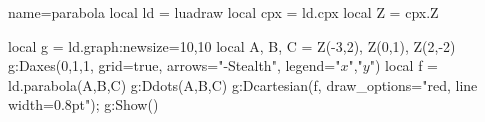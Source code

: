 \documentclass{standalone}%
\begin{document}
\begin{luadraw}{name=parabola}
local ld = luadraw
local cpx = ld.cpx
local Z = cpx.Z

local g = ld.graph:new{size={10,10}}
local A, B, C = Z(-3,2), Z(0,1), Z(2,-2)
g:Daxes({0,1,1}, {grid=true, arrows="-Stealth", legend={"$x$","$y$"}})
local f = ld.parabola(A,B,C)
g:Ddots({A,B,C})
g:Dcartesian(f, {draw_options="red, line width=0.8pt"}); 
g:Show()
\end{luadraw}
\end{document}
